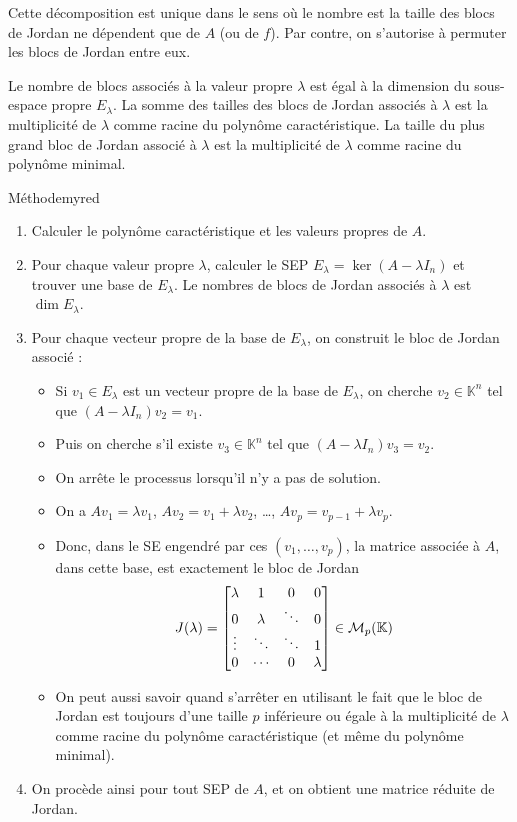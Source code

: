     Cette décomposition est unique dans le sens où le nombre est la taille des blocs de Jordan ne dépendent que de $A$ (ou de $f$). Par contre, on s’autorise à permuter les blocs de Jordan entre eux.

    Le nombre de blocs associés à la valeur propre $\lambda$ est égal à la dimension du sous-espace propre $E_{\lambda}$. La somme des tailles des blocs de Jordan associés à $\lambda$ est la multiplicité de $\lambda$ comme racine du polynôme caractéristique. La taille du plus grand bloc de Jordan associé à $\lambda$ est la multiplicité de $\lambda$ comme racine du polynôme minimal.

    \begin{omed}{Méthode}{myred}
        \begin{enumerate}
            \item Calculer le polynôme caractéristique et les valeurs propres de $A$.
            \item Pour chaque valeur propre $\lambda$, calculer le SEP $E_{\lambda} = \ker(A - \lambda I_n)$ et trouver une base de $E_{\lambda}$. Le nombres de blocs de Jordan associés à $\lambda$ est $\dim E_{\lambda}$. 
            \item Pour chaque vecteur propre de la base de $E_{\lambda}$, on construit le bloc de Jordan associé : 
            \begin{itemize}
                \item Si $v_1 \in E_{\lambda}$ est un vecteur propre de la base de $E_{\lambda}$, on cherche $v_2 \in \mathbb{K}^n$ tel que $(A - \lambda I_n) v_2 = v_1$.
                \item Puis on cherche s’il existe $v_3 \in \mathbb{K}^n$ tel que $(A - \lambda I_n) v_3 = v_2$. 
                \item On arrête le processus lorsqu’il n’y a pas de solution.
                \item On a $Av_1 = \lambda v_1$, $Av_2 = v_1 + \lambda v_2$, \ldots, $A v_p = v_{p-1} + \lambda v_p$.
                \item Donc, dans le SE engendré par ces $(v_1,\ldots,v_p)$, la matrice associée à $A$, dans cette base, est exactement le bloc de Jordan 
                \[ J(\lambda) = \begin{bmatrix}
            \lambda & 1 & 0 & 0 \\
            0 & \lambda & \ddots & 0 \\
            \vdots & \ddots & \ddots & 1 \\
            0 & \cdots & 0 & \lambda
        \end{bmatrix} \in \mathcal{M}_{p}(\mathbb{K}) \]
                \item On peut aussi savoir quand s’arrêter en utilisant le fait que le bloc de Jordan est toujours d’une taille $p$ inférieure ou égale à la multiplicité de $\lambda$ comme racine du polynôme caractéristique (et même du polynôme minimal).    
            \end{itemize}
            \item On procède ainsi pour tout SEP de $A$, et on obtient une matrice réduite de Jordan.
        \end{enumerate}
    \end{omed}

